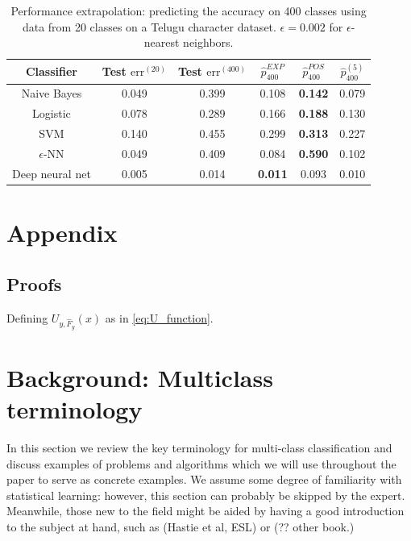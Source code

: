 \documentclass[12pt]{article}
\begin{document}
\begin{table}
\centering
\begin{tabular}{|c||c|c|c|c|c|}\hline
Classifier      & Test $\text{err}^{(20)}$ & Test $\text{err}^{(400)}$ & $\hat{p}^{EXP}_{400}$ & $\hat{p}^{POS}_{400}$ & $\hat{p}^{(5)}_{400}$\\ \hline
Naive Bayes     & 0.049                   & 0.399                   & 0.108              & \textbf{0.142}      & 0.079             \\ \hline
Logistic        & 0.078                   & 0.289                   & 0.166              & \textbf{0.188}      & 0.130             \\ \hline
SVM             & 0.140                   & 0.455                   & 0.299              & \textbf{0.313}      & 0.227             \\ \hline
$\epsilon$-NN   & 0.049                   & 0.409                   & 0.084              & \textbf{0.590}      & 0.102             \\ \hline
Deep neural net & 0.005                   & 0.014                   & \textbf{0.011}     & 0.093               & 0.010             \\ \hline
\end{tabular}
\caption{Performance extrapolation: predicting the accuracy on 400 classes using data from 20 classes on a Telugu character dataset.
$\epsilon = 0.002$ for $\epsilon$-nearest neighbors.}
\end{table}

\appendix
\section{Appendix}
\subsection{Proofs}

\begin{lemma}\label{lemma:U_function}
Defining $U_{y,\hat{F}_y}(x)$ as in \eqref{eq:U_function}.
\end{lemma}

\section{Background: Multiclass terminology}

In this section we review the key terminology for multi-class
classification and discuss examples of problems and algorithms which
we will use throughout the paper to serve as concrete examples.  We
assume some degree of familiarity with statistical learning: however,
this section can probably be skipped by the expert.  Meanwhile, those
new to the field might be aided by having a good introduction to the
subject at hand, such as (Hastie et al, ESL) or (?? other book.)
\end{document}
